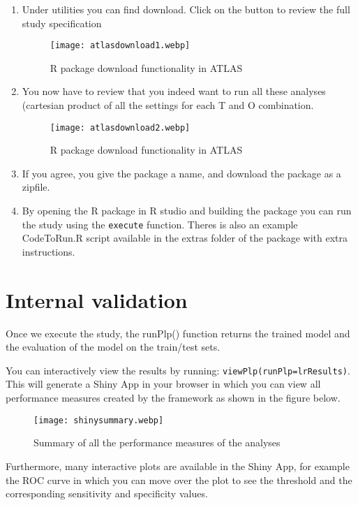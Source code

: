 \documentclass[
]{article}
\begin{document}
\begin{enumerate}
\def\labelenumi{\arabic{enumi})}
\item
  Under utilities you can find download. Click on the button to review
  the full study specification

  \begin{figure}
  \centering
  \texttt{[image: atlasdownload1.webp]}
  \caption{R package download functionality in ATLAS}
  \end{figure}
\item
  You now have to review that you indeed want to run all these analyses
  (cartesian product of all the settings for each T and O combination.

  \begin{figure}
  \centering
  \texttt{[image: atlasdownload2.webp]}
  \caption{R package download functionality in ATLAS}
  \end{figure}
\item
  If you agree, you give the package a name, and download the package as
  a zipfile.
\item
  By opening the R package in R studio and building the package you can
  run the study using the \texttt{execute} function. Theres is also an
  example CodeToRun.R script available in the extras folder of the
  package with extra instructions.
\end{enumerate}

\hypertarget{internal-validation}{%
\section{Internal validation}\label{internal-validation}}

Once we execute the study, the runPlp() function returns the trained
model and the evaluation of the model on the train/test sets.

You can interactively view the results by running:
\texttt{viewPlp(runPlp=lrResults)}. This will generate a Shiny App in
your browser in which you can view all performance measures created by
the framework as shown in the figure below.

\begin{figure}
\centering
\texttt{[image: shinysummary.webp]}
\caption{Summary of all the performance measures of the analyses}
\end{figure}

Furthermore, many interactive plots are available in the Shiny App, for
example the ROC curve in which you can move over the plot to see the
threshold and the corresponding sensitivity and specificity values.
\end{document}
